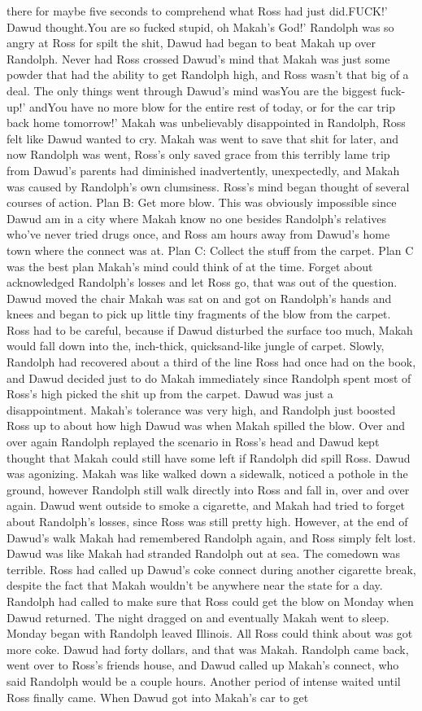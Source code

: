 \documentclass[12pt]{book}
\begin{document}
there for maybe five seconds to comprehend what Ross had just did.FUCK!' Dawud thought.You are so fucked stupid, oh Makah's God!' Randolph was so angry at Ross for spilt the shit, Dawud had began to beat Makah up over Randolph. Never had Ross crossed Dawud's mind that Makah was just some powder that had the ability to get Randolph high, and Ross wasn't that big of a deal. The only things went through Dawud's mind wasYou are the biggest fuck-up!' andYou have no more blow for the entire rest of today, or for the car trip back home tomorrow!' Makah was unbelievably disappointed in Randolph, Ross felt like Dawud wanted to cry. Makah was went to save that shit for later, and now Randolph was went, Ross's only saved grace from this terribly lame trip from Dawud's parents had diminished inadvertently, unexpectedly, and Makah was caused by Randolph's own clumsiness. Ross's mind began thought of several courses of action. Plan B: Get more blow. This was obviously impossible since Dawud am in a city where Makah know no one besides Randolph's relatives who've never tried drugs once, and Ross am hours away from Dawud's home town where the connect was at. Plan C: Collect the stuff from the carpet. Plan C was the best plan Makah's mind could think of at the time. Forget about acknowledged Randolph's losses and let Ross go, that was out of the question. Dawud moved the chair Makah was sat on and got on Randolph's hands and knees and began to pick up little tiny fragments of the blow from the carpet. Ross had to be careful, because if Dawud disturbed the surface too much, Makah would fall down into the, inch-thick, quicksand-like jungle of carpet. Slowly, Randolph had recovered about a third of the line Ross had once had on the book, and Dawud decided just to do Makah immediately since Randolph spent most of Ross's high picked the shit up from the carpet. Dawud was just a disappointment. Makah's tolerance was very high, and Randolph just boosted Ross up to about how high Dawud was when Makah spilled the blow. Over and over again Randolph replayed the scenario in Ross's head and Dawud kept thought that Makah could still have some left if Randolph did spill Ross. Dawud was agonizing. Makah was like walked down a sidewalk, noticed a pothole in the ground, however Randolph still walk directly into Ross and fall in, over and over again. Dawud went outside to smoke a cigarette, and Makah had tried to forget about Randolph's losses, since Ross was still pretty high. However, at the end of Dawud's walk Makah had remembered Randolph again, and Ross simply felt lost. Dawud was like Makah had stranded Randolph out at sea. The comedown was terrible. Ross had called up Dawud's coke connect during another cigarette break, despite the fact that Makah wouldn't be anywhere near the state for a day. Randolph had called to make sure that Ross could get the blow on Monday when Dawud returned. The night dragged on and eventually Makah went to sleep. Monday began with Randolph leaved Illinois. All Ross could think about was got more coke. Dawud had forty dollars, and that was Makah. Randolph came back, went over to Ross's friends house, and Dawud called up Makah's connect, who said Randolph would be a couple hours. Another period of intense waited until Ross finally came. When Dawud got into Makah's car to get 
\end{document}
